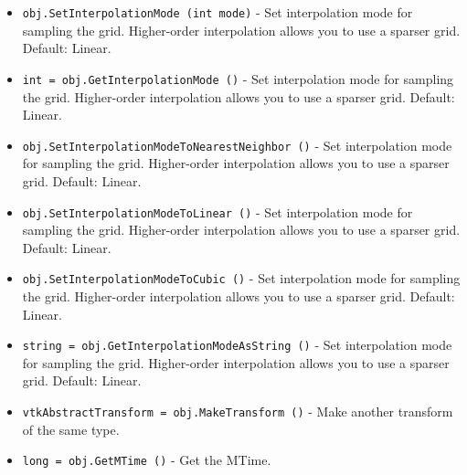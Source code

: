 \begin{itemize}
\item  \verb|obj.SetInterpolationMode (int mode)| -  Set interpolation mode for sampling the grid.  Higher-order
 interpolation allows you to use a sparser grid.
 Default: Linear.

\item  \verb|int = obj.GetInterpolationMode ()| -  Set interpolation mode for sampling the grid.  Higher-order
 interpolation allows you to use a sparser grid.
 Default: Linear.

\item  \verb|obj.SetInterpolationModeToNearestNeighbor ()| -  Set interpolation mode for sampling the grid.  Higher-order
 interpolation allows you to use a sparser grid.
 Default: Linear.

\item  \verb|obj.SetInterpolationModeToLinear ()| -  Set interpolation mode for sampling the grid.  Higher-order
 interpolation allows you to use a sparser grid.
 Default: Linear.

\item  \verb|obj.SetInterpolationModeToCubic ()| -  Set interpolation mode for sampling the grid.  Higher-order
 interpolation allows you to use a sparser grid.
 Default: Linear.

\item  \verb|string = obj.GetInterpolationModeAsString ()| -  Set interpolation mode for sampling the grid.  Higher-order
 interpolation allows you to use a sparser grid.
 Default: Linear.

\item  \verb|vtkAbstractTransform = obj.MakeTransform ()| -  Make another transform of the same type.

\item  \verb|long = obj.GetMTime ()| -  Get the MTime.

\end{itemize}
